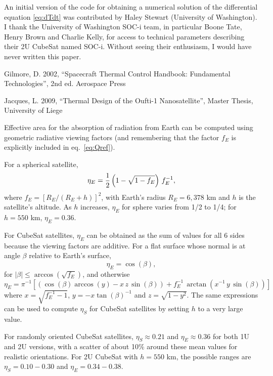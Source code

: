 \documentclass[]{aastex62}
\def\eq#1{\begin{equation} #1 \end{equation}}
\begin{document}
\vskip 0.2in 
{} 
An initial version of the code for obtaining a numerical solution of the differential equation \ref{eq:dTdt} was 
contributed by Haley Stewart (University of Washington). I thank the University of Washington SOC-i team, in 
particular Boone Tate, Henry Brown and Charlie Kelly, for access to technical parameters describing their 
2U CubeSat named SOC-i. Without seeing their enthusiasm, I would have never written this paper. 
 

%
%

\vskip 0.2in 
Gilmore, D. 2002, ``Spacecraft Thermal Control Handbook: Fundamental Technologies'', 2nd ed. Aerospace Press 

Jacques, L. 2009, ``Thermal Design of the Oufti-1 Nanosatellite'', Master Thesis, University of Liege


\appendix{}

\vskip 0.2in

\vskip 0.1in
 Effective area for the absorption of radiation from Earth can be computed using geometric radiative viewing factors
(and remembering that the factor $f_E$ is explicitly included in eq.~\ref{eq:Qref}). 

For a spherical satellite, 
\eq{
                  \eta_E  =  {1\over 2}  \left(1 - \sqrt{1- f_E} \right) \, f_E^{-1},
} 
where $f_E=[R_E/(R_E+h)]^2$, with Earth's radius $R_E=6,378$ km and $h$ is the satellite's altitude. As $h$
increases, $\eta_E$ for sphere varies from 1/2 to 1/4; for $h=550$ km, $\eta_E=0.36$.

For CubeSat satellites, $\eta_E$ can be obtained as the sum of values for all 6 sides because the viewing
factors are additive. For a flat surface whose normal is at angle $\beta$ relative to Earth's surface, 
\eq{
            \eta_E  = \cos(\beta), 
} 
for $|\beta|\le\arccos(\sqrt{f_E})$, and otherwise
\eq{
            \eta_E  = \pi^{-1} \left[ \left( \cos(\beta)\arccos(y) - x \,z \, \sin(\beta) \right) + f_E^{-1} \, \arctan(x^{-1} \, y \, \sin(\beta)) \right] 
} 
where $x=\sqrt{f_E^{-1}-1}$, $y=-x\tan(\beta)^{-1}$ and $z=\sqrt{1-y^2}$. The same expressions can
be used to compute $\eta_S$ for CubeSat satellites by setting $h$ to a very large value. 

For randomly oriented CubeSat satellites, $\eta_S \approx 0.21$ and $\eta_E \approx 0.36$ for both 1U and 2U versions,
with a scatter of about 10\% around these mean values for realistic orientations. For 2U CubeSat
with $h=550$ km, the possible ranges are  $\eta_S = 0.10 - 0.30$ and $\eta_E = 0.34 - 0.38$. 
\end{document}
